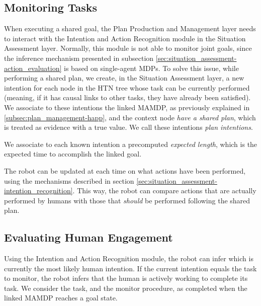 \subsection{Monitoring Tasks}
When executing a shared goal, the Plan Production and Management layer needs to interact with the Intention and Action Recognition module in the Situation Assessment layer. Normally, this module is not able to monitor joint goals, since the inference mechanism presented in subsection \ref{sec:situation_assessment-action_evaluation} is based on single-agent MDPs. To solve this issue, while performing a shared plan, we create, in the Situation Assessment layer, a new intention for each node in the HTN tree whose task can be currently performed (meaning, if it has causal links to other tasks, they have already been satisfied). We associate to these intentions the linked MAMDP, as previously explained in \ref{subsec:plan_management-happ},
 and the context node \textit{have a shared plan}, which is treated as evidence with a true value. We call these intentions \textit{plan intentions}.

We associate to each known intention a precomputed \textit{expected length}, which is the expected time to accomplish the linked goal.

The robot can be updated at each time on what actions have been performed, using the mechanisms described in section \ref{sec:situation_assessment-intention_recognition}. This way, the robot can compare actions that are actually performed by humans with those that \textit{should} be performed following the shared plan.

\subsection{Evaluating Human Engagement}
Using the Intention and Action Recognition module, the robot can infer which is currently the most likely human intention. If the current intention equals the task to monitor, the robot infers that the human is actively working to complete its task. We consider the task, and the monitor procedure, as completed when the linked MAMDP reaches a goal state.


